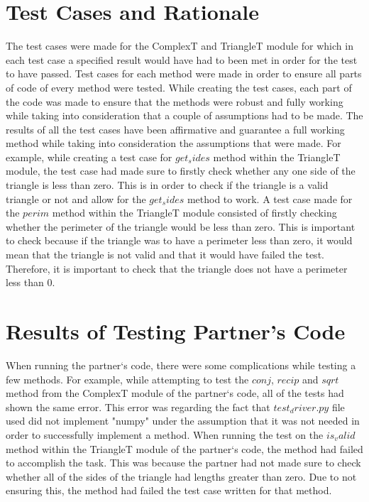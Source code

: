 \documentclass[12pt]{article}
\begin{document}
\section{Test Cases and Rationale} \label{Testing}
The test cases were made for the ComplexT and TriangleT module for which in each test case a specified result would have had to been met in order for the
test to have passed. Test cases for each method were made in order to ensure all parts of code of every method were tested. While creating the test cases,
each part of the code was made to ensure that the methods were robust and fully working while taking into consideration that a couple of assumptions had to
be made. The results of all the test cases have been affirmative and guarantee a full working method while taking into consideration the assumptions that
were made. For example, while creating a test case for $get_sides$ method within the TriangleT module, the test case had made sure to firstly check whether
any one side of the triangle is less than zero. This is in order to check if the triangle is a valid triangle or not and allow for the $get_sides$ method to
work. A test case made for the $perim$ method within the TriangleT module consisted of firstly checking whether the perimeter of the triangle would be less
than zero. This is important to check because if the triangle was to have a perimeter less than zero, it would mean that the triangle is not valid and that
it would have failed the test. Therefore, it is important to check that the triangle does not have a perimeter less than 0.

\section{Results of Testing Partner's Code}
When running the partner`s code, there were some complications while testing a few methods. For example, while attempting to test the $conj$, $recip$ and
$sqrt$ method from the ComplexT module of the partner`s code, all of the tests had shown the same error. This error was regarding the fact that
$test_driver.py$ file used did not implement "numpy" under the assumption that it was not needed in order to successfully implement a method. When running the
test on the $is_valid$ method within the TriangleT module of the partner`s code, the method had failed to accomplish the task. This was because the partner
had not made sure to check whether all of the sides of the triangle had lengths greater than zero. Due to not ensuring this, the method had failed the test
case written for that method.
\end{document}
